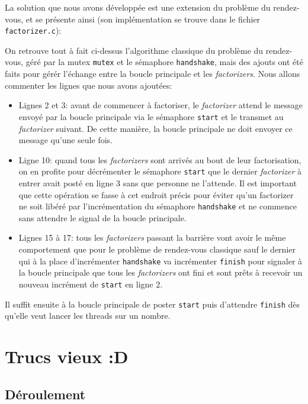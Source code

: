 \documentclass[a4paper,10pt]{article}
\begin{document}
La solution que nous avons développée est une extension du problème du rendez-vous, et se présente ainsi (son implémentation se trouve dans le fichier \texttt{factorizer.c}):


On retrouve tout à fait ci-dessus l'algorithme classique du problème du rendez-vous, géré par la mutex \texttt{mutex} et le sémaphore \texttt{handshake}, mais des ajouts ont été faits pour gérér l'échange entre la boucle principale et les \emph{factorizers}. Nous allons commenter les lignes que nous avons ajoutées:
\begin{itemize}
    \item Lignes 2 et 3: avant de commencer à factoriser, le \emph{factorizer} attend le message envoyé par la boucle principale via le sémaphore \texttt{start} et le transmet au \emph{factorizer} suivant. De cette manière, la boucle principale ne doit envoyer ce message qu'une seule fois.
    \item Ligne 10: quand tous les \emph{factorizers} sont arrivés au bout de leur factorisation, on en profite pour décrémenter le sémaphore \texttt{start} que le dernier \emph{factorizer} à entrer avait posté en ligne 3 sans que personne ne l'attende. Il est important que cette opération se fasse à cet endroit précis pour éviter qu'un factorizer ne soit libéré par l'incrémentation du sémaphore \texttt{handshake} et ne commence sans attendre le signal de la boucle principale.
    \item Lignes 15 à 17: tous les \emph{factorizers} passant la barrière vont avoir le même comportement que pour le problème de rendez-vous classique sauf le dernier qui à la place d'incrémenter \texttt{handshake} va incrémenter \texttt{finish} pour signaler à la boucle principale que tous les \emph{factorizers} ont fini et sont prêts à recevoir un nouveau incrément de \texttt{start} en ligne 2.
\end{itemize}

Il suffit ensuite à la boucle principale de poster \texttt{start} puis d'attendre \texttt{finish} dès qu'elle veut lancer les threads sur un nombre.

\newpage
\section*{Trucs vieux :D}

\subsection*{Déroulement}
\end{document}
